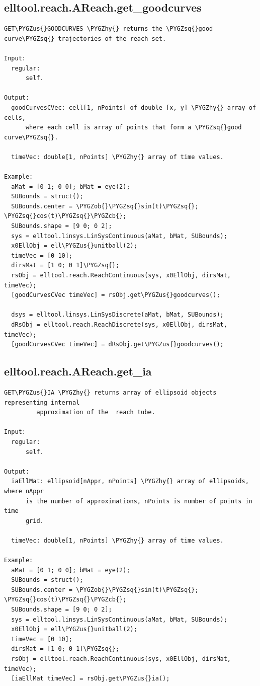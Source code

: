 \documentclass[letterpaper,10pt,english]{sphinxmanual}
\def\PYGZus{\char`\_}
\def\PYGZob{\char`\{}
\def\PYGZcb{\char`\}}
\def\PYGZhy{\char`\-}
\def\PYGZsq{\char`\'}
\begin{document}
\subsection{elltool.reach.AReach.get\_goodcurves}
\label{chap_functions:elltool-reach-areach-get-goodcurves}
\begin{Verbatim}[commandchars=\\\{\}]
GET\PYGZus{}GOODCURVES \PYGZhy{} returns the \PYGZsq{}good curve\PYGZsq{} trajectories of the reach set.

Input:
  regular:
      self.

Output:
  goodCurvesCVec: cell[1, nPoints] of double [x, y] \PYGZhy{} array of cells,
      where each cell is array of points that form a \PYGZsq{}good curve\PYGZsq{}.

  timeVec: double[1, nPoints] \PYGZhy{} array of time values.

Example:
  aMat = [0 1; 0 0]; bMat = eye(2);
  SUBounds = struct();
  SUBounds.center = \PYGZob{}\PYGZsq{}sin(t)\PYGZsq{}; \PYGZsq{}cos(t)\PYGZsq{}\PYGZcb{};
  SUBounds.shape = [9 0; 0 2];
  sys = elltool.linsys.LinSysContinuous(aMat, bMat, SUBounds);
  x0EllObj = ell\PYGZus{}unitball(2);
  timeVec = [0 10];
  dirsMat = [1 0; 0 1]\PYGZsq{};
  rsObj = elltool.reach.ReachContinuous(sys, x0EllObj, dirsMat, timeVec);
  [goodCurvesCVec timeVec] = rsObj.get\PYGZus{}goodcurves();

  dsys = elltool.linsys.LinSysDiscrete(aMat, bMat, SUBounds);
  dRsObj = elltool.reach.ReachDiscrete(sys, x0EllObj, dirsMat, timeVec);
  [goodCurvesCVec timeVec] = dRsObj.get\PYGZus{}goodcurves();
\end{Verbatim}


\subsection{elltool.reach.AReach.get\_ia}
\label{chap_functions:elltool-reach-areach-get-ia}
\begin{Verbatim}[commandchars=\\\{\}]
GET\PYGZus{}IA \PYGZhy{} returns array of ellipsoid objects representing internal
         approximation of the  reach tube.

Input:
  regular:
      self.

Output:
  iaEllMat: ellipsoid[nAppr, nPoints] \PYGZhy{} array of ellipsoids, where nAppr
      is the number of approximations, nPoints is number of points in time
      grid.

  timeVec: double[1, nPoints] \PYGZhy{} array of time values.

Example:
  aMat = [0 1; 0 0]; bMat = eye(2);
  SUBounds = struct();
  SUBounds.center = \PYGZob{}\PYGZsq{}sin(t)\PYGZsq{}; \PYGZsq{}cos(t)\PYGZsq{}\PYGZcb{};
  SUBounds.shape = [9 0; 0 2];
  sys = elltool.linsys.LinSysContinuous(aMat, bMat, SUBounds);
  x0EllObj = ell\PYGZus{}unitball(2);
  timeVec = [0 10];
  dirsMat = [1 0; 0 1]\PYGZsq{};
  rsObj = elltool.reach.ReachContinuous(sys, x0EllObj, dirsMat, timeVec);
  [iaEllMat timeVec] = rsObj.get\PYGZus{}ia();
\end{Verbatim}
\end{document}
